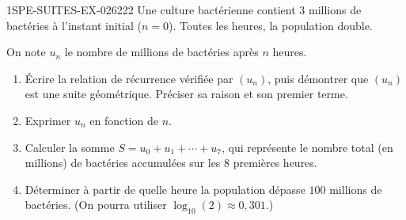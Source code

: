 \begin{exercice}{1SPE-SUITES-EX-026}{2}{22}
Une culture bactérienne contient $3$ millions de bactéries à l'instant initial ($n = 0$). Toutes les heures, la population double.

On note $u_n$ le nombre de millions de bactéries après $n$ heures.

\begin{enumerate}
  \item Écrire la relation de récurrence vérifiée par $(u_n)$, puis démontrer que $(u_n)$ est une suite géométrique. Préciser sa raison et son premier terme.

  \item Exprimer $u_n$ en fonction de $n$.

  \item Calculer la somme $S = u_0 + u_1 + \cdots + u_7$, qui représente le nombre total (en millions) de bactéries accumulées sur les $8$ premières heures.

  \item Déterminer à partir de quelle heure la population dépasse $100$ millions de bactéries. (On pourra utiliser $\log_{10}(2) \approx 0{,}301$.)
\end{enumerate}
\end{exercice}
